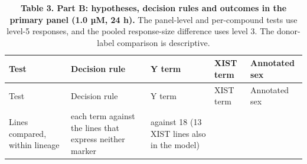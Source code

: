 \documentclass[
  11pt,
  letterpaper,
]{article}
\begin{document}
\begin{longtable}[]{@{}
  >{\raggedright\arraybackslash}p{}
  >{\raggedright\arraybackslash}p{}
  >{\raggedright\arraybackslash}p{}
  >{\raggedright\arraybackslash}p{}
  >{\raggedright\arraybackslash}p{}@{}}
\caption{\textbf{Table 3. Part B: hypotheses, decision rules and
outcomes in the primary panel (1.0 µM, 24 h).} The panel-level and
per-compound tests use level-5 responses, and the pooled response-size
difference uses level 3. The donor-label comparison is
descriptive.}\tabularnewline
\toprule\noalign{}
\begin{minipage}[b]{\linewidth}\raggedright
Test
\end{minipage} & \begin{minipage}[b]{\linewidth}\raggedright
Decision rule
\end{minipage} & \begin{minipage}[b]{\linewidth}\raggedright
Y term
\end{minipage} & \begin{minipage}[b]{\linewidth}\raggedright
XIST term
\end{minipage} & \begin{minipage}[b]{\linewidth}\raggedright
Annotated sex
\end{minipage} \\
\midrule\noalign{}
\endfirsthead
\toprule\noalign{}
\begin{minipage}[b]{\linewidth}\raggedright
Test
\end{minipage} & \begin{minipage}[b]{\linewidth}\raggedright
Decision rule
\end{minipage} & \begin{minipage}[b]{\linewidth}\raggedright
Y term
\end{minipage} & \begin{minipage}[b]{\linewidth}\raggedright
XIST term
\end{minipage} & \begin{minipage}[b]{\linewidth}\raggedright
Annotated sex
\end{minipage} \\
\midrule\noalign{}
\endhead
\bottomrule\noalign{}
\endlastfoot
Lines compared, within lineage & each term against the lines that
express neither marker & 10 against 18 (13 XIST lines also in the model)

\end{longtable}
\end{document}
